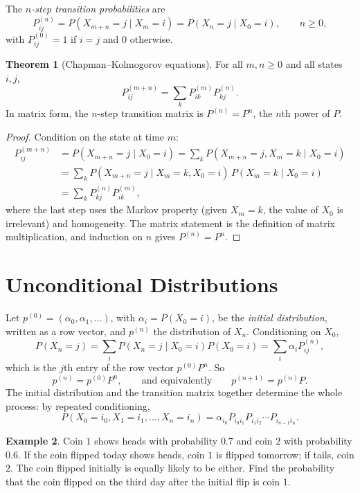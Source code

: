 \documentclass[12pt,a4paper]{report}
\theoremstyle{definition}
\newtheorem{thm}{Theorem}[section]
\newtheorem{exa}[thm]{Example}
\begin{document}
The \emph{$n$-step transition probabilities} are
\[P_{ij}^{(n)} = P(X_{m + n} = j\mid X_m = i) = P(X_n = j\mid X_0 = i),\qquad n\geq 0,\]
with $P_{ij}^{(0)} = 1$ if $i = j$ and $0$ otherwise.

\begin{thm}[Chapman--Kolmogorov equations]
\label{thm:ck}
For all $m, n\geq 0$ and all states $i, j$,
\[P_{ij}^{(m + n)} = \sum_kP_{ik}^{(m)}P_{kj}^{(n)} .\]
In matrix form, the $n$-step transition matrix is $P^{(n)} = P^n$, the $n$th power of $P$.
\end{thm}

\begin{proof}
Condition on the state at time $m$:
\begin{align*}
P_{ij}^{(m + n)} &= P(X_{m + n} = j\mid X_0 = i) = \sum_kP(X_{m + n} = j, X_m = k\mid X_0 = i)\\
&= \sum_kP(X_{m + n} = j\mid X_m = k, X_0 = i)\,P(X_m = k\mid X_0 = i)\\
&= \sum_kP_{kj}^{(n)}P_{ik}^{(m)},
\end{align*}
where the last step uses the Markov property (given $X_m = k$, the value of $X_0$ is
irrelevant) and homogeneity. The matrix statement is the definition of matrix
multiplication, and induction on $n$ gives $P^{(n)} = P^n$.
\end{proof}

\section{Unconditional Distributions}

Let $p^{(0)} = (\alpha_0, \alpha_1, \dots)$, with $\alpha_i = P(X_0 = i)$, be the \emph{initial
distribution}, written as a row vector, and $p^{(n)}$ the distribution of $X_n$. Conditioning
on $X_0$,
\[P(X_n = j) = \sum_iP(X_n = j\mid X_0 = i)P(X_0 = i) = \sum_i\alpha_iP_{ij}^{(n)},\]
which is the $j$th entry of the row vector $p^{(0)}P^n$. So
\[p^{(n)} = p^{(0)}P^n,\qquad\text{and equivalently}\qquad p^{(n + 1)} = p^{(n)}P .\]
The initial distribution and the transition matrix together determine the whole process:
by repeated conditioning,
\[P(X_0 = i_0, X_1 = i_1, \dots, X_n = i_n) = \alpha_{i_0}P_{i_0i_1}P_{i_1i_2}\cdots P_{i_{n-1}i_n} .\]

\begin{exa}
\label{ex:coins}
Coin $1$ shows heads with probability $0.7$ and coin $2$ with probability $0.6$. If the coin
flipped today shows heads, coin $1$ is flipped tomorrow; if tails, coin $2$. The coin flipped
initially is equally likely to be either. Find the probability that the coin flipped on the
third day after the initial flip is coin $1$.
\end{exa}
\end{document}
